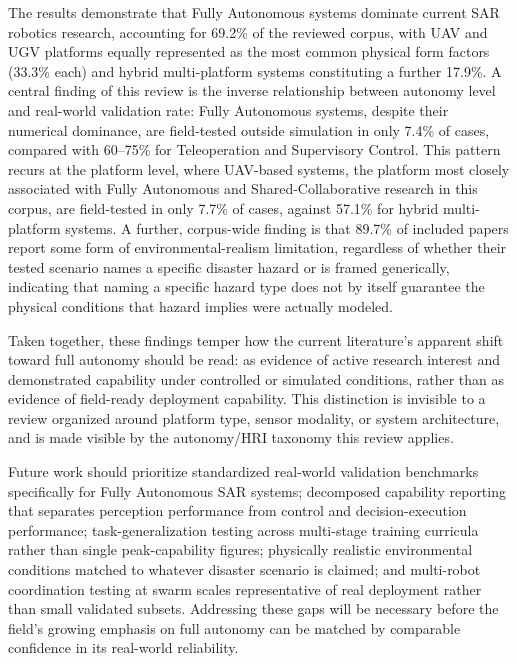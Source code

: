 \documentclass[journal]{IEEEtran}
\begin{document}
The results demonstrate that Fully Autonomous systems dominate current SAR robotics research, accounting for 69.2\% of the reviewed corpus, with UAV and UGV platforms equally represented as the most common physical form factors (33.3\% each) and hybrid multi-platform systems constituting a further 17.9\%. A central finding of this review is the inverse relationship between autonomy level and real-world validation rate: Fully Autonomous systems, despite their numerical dominance, are field-tested outside simulation in only 7.4\% of cases, compared with 60--75\% for Teleoperation and Supervisory Control. This pattern recurs at the platform level, where UAV-based systems, the platform most closely associated with Fully Autonomous and Shared-Collaborative research in this corpus, are field-tested in only 7.7\% of cases, against 57.1\% for hybrid multi-platform systems. A further, corpus-wide finding is that 89.7\% of included papers report some form of environmental-realism limitation, regardless of whether their tested scenario names a specific disaster hazard or is framed generically, indicating that naming a specific hazard type does not by itself guarantee the physical conditions that hazard implies were actually modeled.

Taken together, these findings temper how the current literature's apparent shift toward full autonomy should be read: as evidence of active research interest and demonstrated capability under controlled or simulated conditions, rather than as evidence of field-ready deployment capability. This distinction is invisible to a review organized around platform type, sensor modality, or system architecture, and is made visible by the autonomy/HRI taxonomy this review applies.

Future work should prioritize standardized real-world validation benchmarks specifically for Fully Autonomous SAR systems; decomposed capability reporting that separates perception performance from control and decision-execution performance; task-generalization testing across multi-stage training curricula rather than single peak-capability figures; physically realistic environmental conditions matched to whatever disaster scenario is claimed; and multi-robot coordination testing at swarm scales representative of real deployment rather than small validated subsets. Addressing these gaps will be necessary before the field's growing emphasis on full autonomy can be matched by comparable confidence in its real-world reliability.
\end{document}
